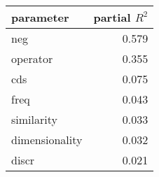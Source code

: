 \begin{tabular}{lr}
\toprule
      parameter &  partial $R^2$ \\
\midrule
            neg &      0.579 \\
       operator &      0.355 \\
            cds &      0.075 \\
           freq &      0.043 \\
     similarity &      0.033 \\
 dimensionality &      0.032 \\
          discr &      0.021 \\
\bottomrule
\end{tabular}
